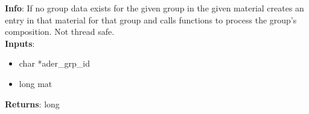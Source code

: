 \textbf{Info}: If no group data exists for the given group in the given material
creates an entry in that material for that group and calls functions to process
the group's composition. Not thread safe. \\

\noindent \textbf{Inputs}:
\begin{itemize}
\item{char *ader\_grp\_id}
\item{long mat}
\end{itemize}

\noindent \textbf{Returns}: long
